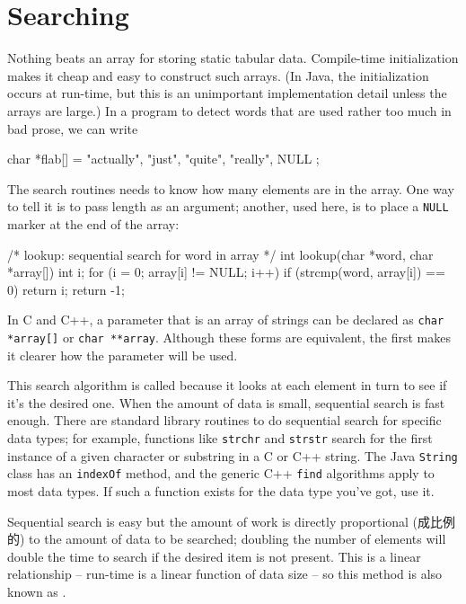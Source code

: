 \section{Searching}
\label{sec:searching}
Nothing beats an array for storing static tabular data. Compile-time
initialization makes it cheap and easy to construct such arrays. (In Java,
the initialization occurs at run-time, but this is an unimportant
implementation detail unless the arrays are large.) In a program to detect
words that are used rather too much in bad prose, we can write
\begin{wellcode}
    char *flab[] = {
        "actually",
        "just",
        "quite",
        "really",
        NULL
    };
\end{wellcode}
The search routines needs to know how many elements are in the array. One
way to tell it is to pass length as an argument; another, used here, is to
place a \verb'NULL' marker at the end of the array:
\begin{wellcode}
    /* lookup: sequential search for word in array */
    int lookup(char *word, char *array[])
    {
        int i;
        for (i = 0; array[i] != NULL; i++)
           if (strcmp(word, array[i]) == 0)
                return i;
        return -1;
    }
\end{wellcode}
In C and C++, a parameter that is an array of strings can be declared as
\verb"char *array[]" or \verb"char **array". Although these forms are
equivalent, the first makes it clearer how the parameter will be used.

This search algorithm is called  because
it looks at each element in turn to see if it's the desired one. When the
amount of data is small, sequential search is fast enough. There are
standard library routines to do sequential search for specific data types;
for example, functions like \texttt{strchr} and \texttt{strstr} search for
the first instance of a given character or substring in a C or C++ string.
The Java \verb'String' class has an \verb'indexOf' method, and the generic
C++ \verb'find' algorithms apply to most data types. If such a function
exists for the data type you've got, use it.

Sequential search is easy but the amount of work is directly proportional
(成比例的)
to the amount of data to be searched; doubling the number of elements will
double the time to search if the desired item is not present. This is a
linear relationship -- run-time is a linear function of data size -- so
this method is also known as .


